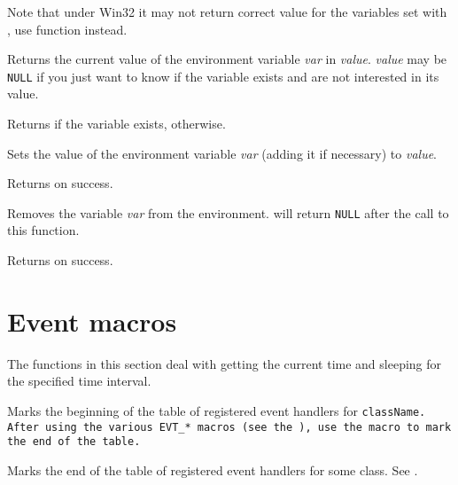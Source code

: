 Note that under Win32 it may not return correct value for the variables set
with , use  function
instead.


\label{wxgetenv}


Returns the current value of the environment variable {\it var} in {\it value}.
{\it value} may be {\tt NULL} if you just want to know if the variable exists
and are not interested in its value.

Returns \true if the variable exists, \false otherwise.


\label{wxsetenv}


Sets the value of the environment variable {\it var} (adding it if necessary)
to {\it value}.

Returns \true on success.


\label{wxunsetenv}


Removes the variable {\it var} from the environment.
 will return {\tt NULL} after the call to this
function.

Returns \true on success.





\section{Event macros}\label{eventmacros}

The functions in this section deal with getting the current time and sleeping
for the specified time interval.


\label{wxbegineventtable}


Marks the beginning of the table of registered event handlers for \tt{className}.
After using the various \tt{EVT_*} macros (see the 
), use the
 macro 
to mark the end of the table.


\label{wxendeventtable}


Marks the end of the table of registered event handlers for some class.
See .

